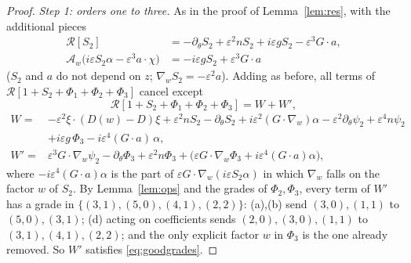 \documentclass[11pt]{article}
\newcommand{\eps}{\varepsilon}
\newcommand{\cA}{\mathcal{A}}
\newcommand{\cR}{\mathcal{R}}
\theoremstyle{remark}
\begin{document}
\begin{proof}
\emph{Step 1: orders one to three.} As in the proof of Lemma~\ref{lem:res},
with the additional pieces
\begin{align*}
  \cR[S_2] &= -\partial_\theta S_2 + \eps^2nS_2 + i\eps gS_2 - \eps^3G\cdot a,\\
  \cA_w\bigl(i\eps S_2\alpha - \eps^3a\cdot\chi\bigr)
    &= -i\eps gS_2 + \eps^3G\cdot a
\end{align*}
($S_2$ and $a$ do not depend on $z$; $\nabla_wS_2 = -\eps^2a$). Adding as
before, all terms of $\cR[1+S_2+\Phi_1+\Phi_2+\Phi_3]$ cancel except
\begin{equation}
  \cR[1+S_2+\Phi_1+\Phi_2+\Phi_3] = W + W',
  \label{eq:WW}
\end{equation}
\begin{align*}
  W ={}& -\eps^2\xi\cdot(D(w)-D)\xi + \eps^2nS_2 - \partial_\theta S_2
     + i\eps^2(G\cdot\nabla_w)\alpha - \eps^2\partial_\theta\psi_2 + \eps^4n\psi_2\\
   & + i\eps g\,\Phi_3 - i\eps^4(G\cdot a)\,\alpha,\\
  W' ={}& \eps^3G\cdot\nabla_w\psi_2 - \partial_\theta\Phi_3 + \eps^2n\Phi_3
     + \bigl(\eps G\cdot\nabla_w\Phi_3 + i\eps^4(G\cdot a)\alpha\bigr),
\end{align*}
where $-i\eps^4(G\cdot a)\alpha$ is the part of
$\eps G\cdot\nabla_w(i\eps S_2\alpha)$ in which $\nabla_w$ falls on the factor
$w$ of $S_2$. By Lemma~\ref{lem:ops} and the grades of $\Phi_2,\Phi_3$, every
term of $W'$ has a grade in
$\{(3,1),(5,0),(4,1),(2,2)\}$: (a),(b) send $(3,0),(1,1)$ to $(5,0),(3,1)$;
(d) acting on coefficients sends $(2,0),(3,0),(1,1)$ to $(3,1),(4,1),(2,2)$;
and the only explicit factor $w$ in $\Phi_3$ is the one already removed. So
$W'$ satisfies \eqref{eq:goodgrades}.


\end{proof}
\end{document}
